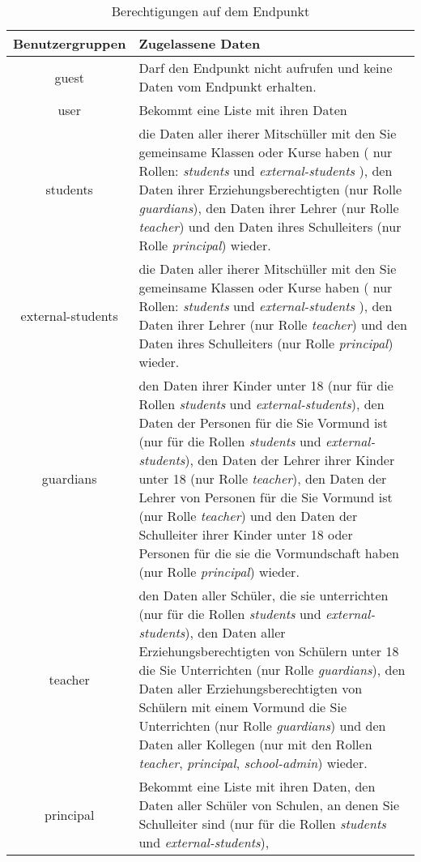 \begin{longtable}{|c|p{}|}
\caption{Berechtigungen auf dem Endpunkt}
\endfoot
\caption{Berechtigungen auf dem Endpunkt}
\label{tab:end:rest:api:school:users:read:right} 
\endlastfoot
\hline
\textbf{Benutzergruppen} & \textbf{Zugelassene Daten} \\ \hline
\endhead
guest & Darf den Endpunkt nicht aufrufen und keine Daten vom Endpunkt erhalten. \\ \hline
user & Bekommt eine Liste mit ihren Daten \\ \hline 
students & die Daten aller iherer Mitschüller mit den Sie gemeinsame Klassen oder Kurse haben ( nur Rollen: \textit{students} und \textit{external-students} ),
           den Daten ihrer Erziehungsberechtigten (nur Rolle \textit{guardians}), 
					 den Daten ihrer Lehrer (nur Rolle \textit{teacher}) und 
					 den Daten ihres Schulleiters (nur Rolle \textit{principal}) wieder.\\ \hline
external-students &  die Daten aller iherer Mitschüller mit den Sie gemeinsame Klassen oder Kurse haben ( nur Rollen: \textit{students} und \textit{external-students} ),
           den Daten ihrer Lehrer (nur Rolle \textit{teacher}) und 
					 den Daten ihres Schulleiters (nur Rolle \textit{principal}) wieder.\\ \hline
guardians & den Daten ihrer Kinder unter 18 (nur für die Rollen \textit{students} und \textit{external-students}), 
					den Daten der Personen für die Sie Vormund ist (nur für die Rollen \textit{students} und \textit{external-students}), 
					den Daten der Lehrer ihrer Kinder unter 18 (nur Rolle \textit{teacher}),
					den Daten der Lehrer von Personen für die Sie Vormund ist (nur Rolle \textit{teacher})	und
					den Daten der Schulleiter ihrer Kinder unter 18 oder Personen für die sie die Vormundschaft haben (nur Rolle \textit{principal})
					wieder.\\ \hline
teacher & den Daten aller Schüler, die sie unterrichten (nur für die Rollen \textit{students} und \textit{external-students}),
					den Daten aller Erziehungsberechtigten von Schülern unter 18 die Sie Unterrichten (nur Rolle \textit{guardians}),
					den Daten aller Erziehungsberechtigten von Schülern mit einem Vormund die Sie Unterrichten (nur Rolle \textit{guardians}) und
					den Daten aller Kollegen (nur mit den Rollen \textit{teacher}, \textit{principal}, \textit{school-admin}) 
					wieder.\\ \hline
principal & Bekommt eine Liste mit ihren Daten,
            den Daten aller Schüler von Schulen, an denen Sie Schulleiter sind (nur für die Rollen \textit{students} und \textit{external-students}),

\end{longtable}
